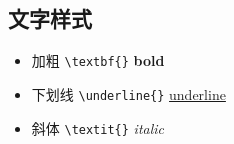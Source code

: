 \subsection{文字样式}
\begin{itemize}
    \item 加粗 \verb=\textbf{}= \textbf{bold}
    \item 下划线 \verb=\underline{}= \underline{underline}
    \item 斜体 \verb=\textit{}= \textit{italic}
\end{itemize}
